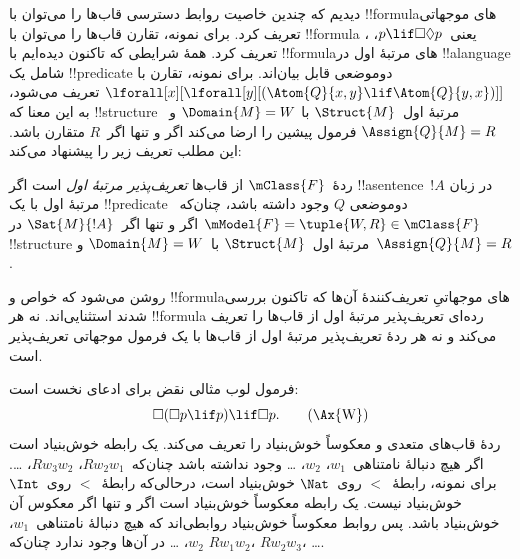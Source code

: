 \documentclass[../../../include/open-logic-section]{subfiles}
\begin{document}


دیدیم که چندین خاصیت روابط دسترسی قاب‌ها را می‌توان با !!{formula}های
موجهاتی تعریف کرد. برای نمونه، تقارن قاب‌ها را می‌توان با !!{formula}
، یعنی~$p \lif \Box\Diamond p$، تعریف کرد. همهٔ شرایطی که تاکنون
دیده‌ایم با !!{formula}های مرتبهٔ اول در !!a{language} شامل یک
!!{predicate} دوموضعی قابل بیان‌اند. برای نمونه، تقارن با
$\lforall[x][\lforall[y][(\Atom{Q}{x,y} \lif \Atom{Q}{y, x})]]$ تعریف
می‌شود، به این معنا که !!{structure} مرتبهٔ اول~$\Struct{M}$ با
$\Domain{M} = W$ و~$\Assign{Q}{M} = R$ فرمول پیشین را ارضا می‌کند اگر
و تنها اگر~$R$ متقارن باشد. این مطلب تعریف زیر را پیشنهاد می‌کند:

\begin{defn}
  ردهٔ~$\mClass{F}$ از قاب‌ها \emph{تعریف‌پذیر مرتبهٔ اول} است اگر
  !!a{sentence}~$!A$ در زبان مرتبهٔ اول با یک !!{predicate} دوموضعی
  $Q$ وجود داشته باشد، چنان‌که~$\mModel{F} = \tuple{W, R} \in
  \mClass{F}$ اگر و تنها اگر~$\Sat{M}{!A}$ در !!{structure} مرتبهٔ
  اول~$\Struct{M}$ با~$\Domain{M} = W$ و~$\Assign{Q}{M} = R$.
\end{defn}

روشن می‌شود که خواص و !!{formula}های موجهاتیِ تعریف‌کنندهٔ آن‌ها که
تاکنون بررسی شدند استثنایی‌اند. نه هر !!{formula} رده‌ای تعریف‌پذیر
مرتبهٔ اول از قاب‌ها را تعریف می‌کند و نه هر ردهٔ تعریف‌پذیر مرتبهٔ اول
از قاب‌ها با یک فرمول موجهاتی تعریف‌پذیر است.

فرمول لوب مثالی نقض برای ادعای نخست است:
\begin{equation}
\Box(\Box p \lif p) \lif \Box p. \tag{\Ax{W}}
\end{equation}
 ردهٔ قاب‌های متعدی و معکوساً خوش‌بنیاد را تعریف می‌کند. یک
رابطه خوش‌بنیاد است اگر هیچ دنبالهٔ نامتناهی~$w_1$، $w_2$، \dots{}
وجود نداشته باشد چنان‌که~$Rw_2w_1$، $Rw_3w_2$، \dots. برای نمونه،
رابطهٔ~$<$ روی~$\Nat$ خوش‌بنیاد است، درحالی‌که رابطهٔ~$<$ روی~$\Int$
خوش‌بنیاد نیست. یک رابطه معکوساً خوش‌بنیاد است اگر و تنها اگر معکوس آن
خوش‌بنیاد باشد. پس روابط معکوساً خوش‌بنیاد روابطی‌اند که هیچ دنبالهٔ
نامتناهی~$w_1$، $w_2$، \dots{} در آن‌ها وجود ندارد چنان‌که
$Rw_1w_2$، $Rw_2w_3$، \dots.
\end{document}
